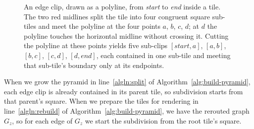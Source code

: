\documentclass[review]{vgtc}          %
\begin{document}
\begin{figure}[!tb]
  \centering
  \caption{An edge clip, drawn as a polyline, from \emph{start} to
    \emph{end} inside a tile. The two red midlines split the tile
    into four congruent square sub-tiles and meet the polyline at the four
    points $a$, $b$, $c$, $d$; at $d$ the polyline touches the
    horizontal midline without crossing it. Cutting the polyline at
    these points yields five sub-clips $[\mathit{start},a]$,
    $[a,b]$, $[b,c]$, $[c,d]$, $[d,\mathit{end}]$, each contained in
    one sub-tile and meeting that sub-tile's boundary only at its
    endpoints.}
  \label{fig:clip}
\end{figure}

When we grow the pyramid in line~\ref{algln:split} of
Algorithm~\ref{alg:build-pyramid}, each edge clip is already
contained in its parent tile, so subdivision starts from that
parent's square. When we prepare the tiles for rendering in
line~\ref{algln:rebuild} of Algorithm~\ref{alg:build-pyramid}, we
have the rerouted graph $G_z$, so for each edge of $G_z$ we start
the subdivision from the root tile's square.
\end{document}
